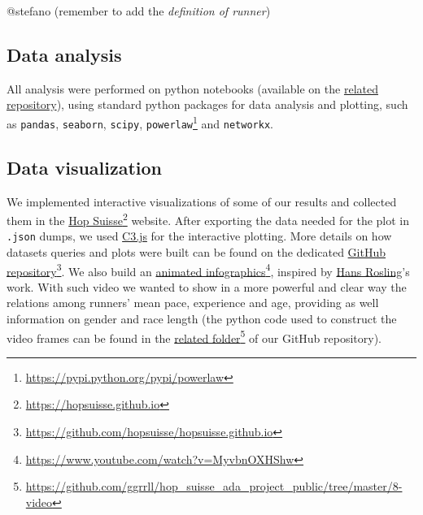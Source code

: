 \documentclass[fleqn,10pt]{wlscirep}
\begin{document}
		@stefano 
		(remember to add the \textit{definition of runner})
	
		
	
	
	\subsection*{Data analysis}
	
		All analysis were performed on python notebooks (available on the \href{related repository}{related repository}), using standard python packages for data analysis and plotting, such as \texttt{pandas}, \texttt{seaborn}, \texttt{scipy}, \texttt{powerlaw}\footnote{\url{https://pypi.python.org/pypi/powerlaw}} and \texttt{networkx}.
	
	
	\subsection*{Data visualization}		
	
		We implemented interactive visualizations of some of our results and collected  them in the   \href{https://hopsuisse.github.io}{Hop Suisse}\footnote{\url{https://hopsuisse.github.io}} website.
		After exporting the data needed for the plot in \texttt{.json} dumps, we used \href{http://c3js.org}{C3.js} for the interactive plotting. More details on how datasets queries and plots were built can be found on the dedicated \href{https://github.com/hopsuisse/hopsuisse.github.io}{GitHub repository}\footnote{\url{https://github.com/hopsuisse/hopsuisse.github.io}}.
		We also build an \href{https://www.youtube.com/watch?v=MyvbnOXHShw}{animated infographics}\footnote{\url{https://www.youtube.com/watch?v=MyvbnOXHShw}}, inspired by  \href{https://en.wikipedia.org/wiki/Hans_Rosling}{Hans Rosling}'s work. With such video we wanted to show in a more powerful and clear way the relations among runners' mean pace, experience and age, providing as well information on gender and race length
		(the python code used to construct the video frames can be found in the \href{https://github.com/ggrrll/hop_suisse_ada_project_public/tree/master/8-video}{related folder}\footnote{\url{https://github.com/ggrrll/hop_suisse_ada_project_public/tree/master/8-video}} of our GitHub repository).
	

%
\end{document}

